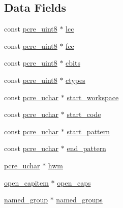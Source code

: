 \subsection*{Data Fields}
\begin{DoxyCompactItemize}
\item 
const \hyperlink{pcre__internal_8h_a6e9105ffeed09883190f9bf30d93e210}{pcre\+\_\+uint8} $\ast$ \hyperlink{structcompile__data_a612f2b5160e1bbfcbcff8aaf96f14e09}{lcc}
\item 
const \hyperlink{pcre__internal_8h_a6e9105ffeed09883190f9bf30d93e210}{pcre\+\_\+uint8} $\ast$ \hyperlink{structcompile__data_acbef42e411ed9f99e1aa524c1eb9e429}{fcc}
\item 
const \hyperlink{pcre__internal_8h_a6e9105ffeed09883190f9bf30d93e210}{pcre\+\_\+uint8} $\ast$ \hyperlink{structcompile__data_a65e8af2519e1043f264029a4129ca9b5}{cbits}
\item 
const \hyperlink{pcre__internal_8h_a6e9105ffeed09883190f9bf30d93e210}{pcre\+\_\+uint8} $\ast$ \hyperlink{structcompile__data_a352c4e0b00f520e5ba3f2259000bf33c}{ctypes}
\item 
const \hyperlink{pcre__internal_8h_a9d8efd0ad5b191db2a1793268600deb9}{pcre\+\_\+uchar} $\ast$ \hyperlink{structcompile__data_a5ece64e93e6cdb0fdc1f76dce25d6284}{start\+\_\+workspace}
\item 
const \hyperlink{pcre__internal_8h_a9d8efd0ad5b191db2a1793268600deb9}{pcre\+\_\+uchar} $\ast$ \hyperlink{structcompile__data_a4b783863acd7691e06a48663c5ecd6f6}{start\+\_\+code}
\item 
const \hyperlink{pcre__internal_8h_a9d8efd0ad5b191db2a1793268600deb9}{pcre\+\_\+uchar} $\ast$ \hyperlink{structcompile__data_a76acc9face4905939e25dd0b20ff9bec}{start\+\_\+pattern}
\item 
const \hyperlink{pcre__internal_8h_a9d8efd0ad5b191db2a1793268600deb9}{pcre\+\_\+uchar} $\ast$ \hyperlink{structcompile__data_aca1238de6da2589b5c41189023da979d}{end\+\_\+pattern}
\item 
\hyperlink{pcre__internal_8h_a9d8efd0ad5b191db2a1793268600deb9}{pcre\+\_\+uchar} $\ast$ \hyperlink{structcompile__data_ad7b414eba889034a23c9d162b74e247e}{hwm}
\item 
\hyperlink{structopen__capitem}{open\+\_\+capitem} $\ast$ \hyperlink{structcompile__data_a2b9fe32c9c0c3edd45dea13a5793f5c0}{open\+\_\+caps}
\item 
\hyperlink{structnamed__group}{named\+\_\+group} $\ast$ \hyperlink{structcompile__data_a74515a73c037ab368004309ea64c8980}{named\+\_\+groups}
\item 

\end{DoxyCompactItemize}
